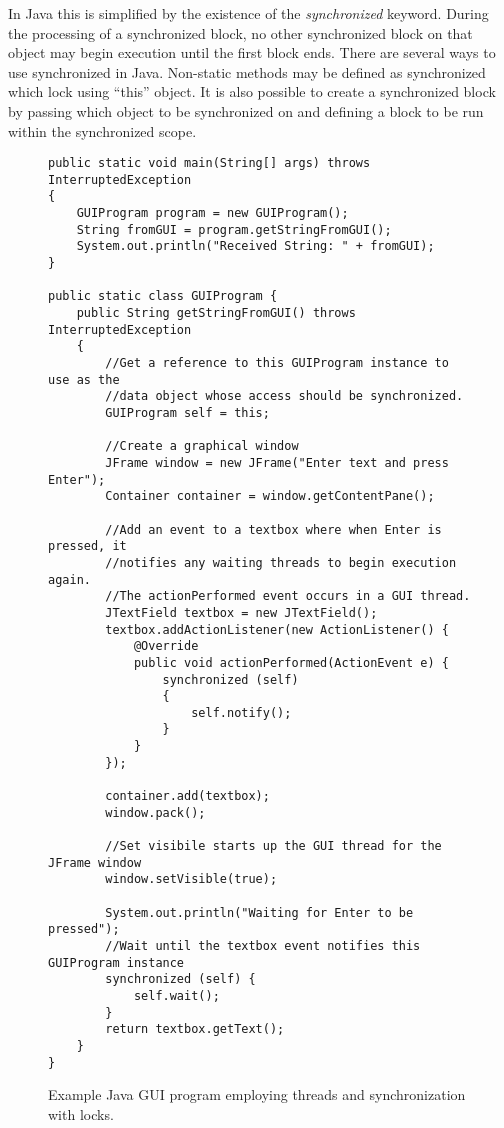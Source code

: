\documentclass{sig-alternate}
\begin{document}
In Java this is simplified by the existence of the \emph{synchronized} keyword. During the processing of a synchronized block, no other synchronized block on that object may begin execution until the first block ends. There are several ways to use synchronized in Java. Non-static methods may be defined as synchronized which lock using ``this'' object. It is also possible to create a synchronized block by passing which object to be synchronized on and defining a block to be run within the synchronized scope.~\cite{JavaLangSpec}

\begin{figure}
\begin{lstlisting}
public static void main(String[] args) throws InterruptedException
{
    GUIProgram program = new GUIProgram();
    String fromGUI = program.getStringFromGUI();
    System.out.println("Received String: " + fromGUI);
}

public static class GUIProgram {
    public String getStringFromGUI() throws InterruptedException
    {
        //Get a reference to this GUIProgram instance to use as the
        //data object whose access should be synchronized.
        GUIProgram self = this;

        //Create a graphical window
        JFrame window = new JFrame("Enter text and press Enter");
        Container container = window.getContentPane();

        //Add an event to a textbox where when Enter is pressed, it
        //notifies any waiting threads to begin execution again.
        //The actionPerformed event occurs in a GUI thread.
        JTextField textbox = new JTextField();
        textbox.addActionListener(new ActionListener() {
            @Override
            public void actionPerformed(ActionEvent e) {
                synchronized (self)
                {
                    self.notify();
                }
            }
        });

        container.add(textbox);
        window.pack();

        //Set visibile starts up the GUI thread for the JFrame window
        window.setVisible(true);

        System.out.println("Waiting for Enter to be pressed");
        //Wait until the textbox event notifies this GUIProgram instance
        synchronized (self) {
            self.wait();
        }
        return textbox.getText();
    }
}
\end{lstlisting}
\caption{Example Java GUI program employing threads and synchronization with locks.}
\label{fig:locks}
\end{figure}
\end{document}
